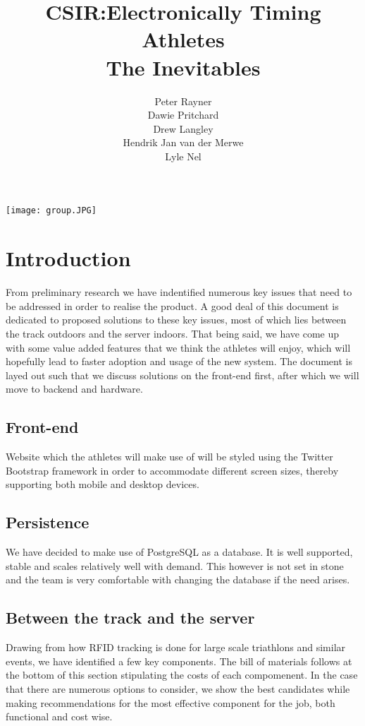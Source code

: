 \documentclass{article}
\title{CSIR:Electronically Timing Athletes\\
The Inevitables
}
\author{  
            Peter Rayner\\
            Dawie Pritchard\\
            Drew Langley\\
            Hendrik Jan van der Merwe\\
            Lyle Nel\\
        }
\begin{document}
\maketitle

\texttt{[image: group.JPG]}

\newpage

\tableofcontents

\newpage


\section{Introduction}
From preliminary research we have indentified numerous key issues that need to be addressed in order to realise the product. A good deal of this document is dedicated to proposed solutions to these key issues, most of which lies between the track outdoors and the server indoors. That being said, we have come up with some value added features that we think the athletes will enjoy, which will hopefully lead to faster adoption and usage of the new system. The document is layed out such that we discuss solutions on the front-end first, after which we will move to backend and hardware.

\subsection{Front-end}
Website which the athletes will make use of will be styled using the Twitter Bootstrap framework in order to accommodate different screen sizes, thereby supporting both mobile and desktop devices.

\subsection{Persistence}
We have decided to make use of PostgreSQL as a database. It is well supported, stable and scales relatively well with demand. This however is not set in stone and the team is very comfortable with changing the database if the need arises.

\subsection{Between the track and the server}
Drawing from how RFID tracking is done for large scale triathlons and similar events, we have identified a few key components. The bill of materials follows at the bottom of this section stipulating the costs of each compomenent. In the case that there are numerous options to consider, we show the best candidates while making recommendations for the most effective component for the job, both functional and cost wise.
\end{document}
